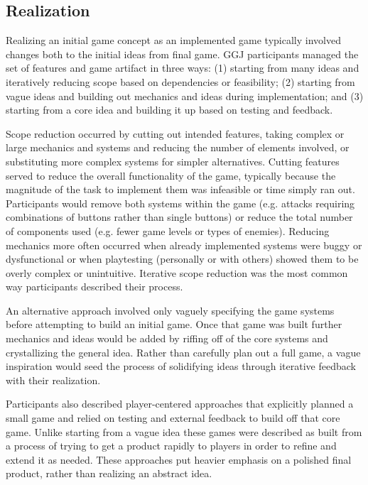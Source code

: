 \documentclass{sig-alternate}
\begin{document}
\subsection{Realization}
Realizing an initial game concept as an implemented game typically involved changes both to the initial ideas from final game. GGJ participants managed the set of features and game artifact in three ways:
(1) starting from many ideas and iteratively reducing scope based on dependencies or feasibility;
(2) starting from vague ideas and building out mechanics and ideas during implementation;
and
(3) starting from a core idea and building it up based on testing and feedback.

Scope reduction occurred by cutting out intended features, taking complex or large mechanics and systems and reducing the number of elements involved, or substituting more complex systems for simpler alternatives.
Cutting features served to reduce the overall functionality of the game, typically because the magnitude of the task to implement them was infeasible or time simply ran out. Participants would remove both systems within the game (e.g. attacks requiring combinations of buttons rather than single buttons) or reduce the total number of components used (e.g. fewer game levels or types of enemies).
Reducing mechanics more often occurred when already implemented systems were buggy or dysfunctional or when playtesting (personally or with others) showed them to be overly complex or unintuitive. 
Iterative scope reduction was the most common way participants described their process.

An alternative approach involved only vaguely specifying the game systems before attempting to build an initial game. Once that game was built further mechanics and ideas would be added by riffing off of the core systems and crystallizing the general idea.
Rather than carefully plan out a full game, a vague inspiration would seed the process of solidifying ideas through iterative feedback with their realization.

Participants also described player-centered approaches that explicitly planned a small game and relied on testing and external feedback to build off that core game. Unlike starting from a vague idea these games were described as built from a process of trying to get a product rapidly to players in order to refine and extend it as needed. These approaches put heavier emphasis on a polished final product, rather than realizing an abstract idea.
\end{document}
